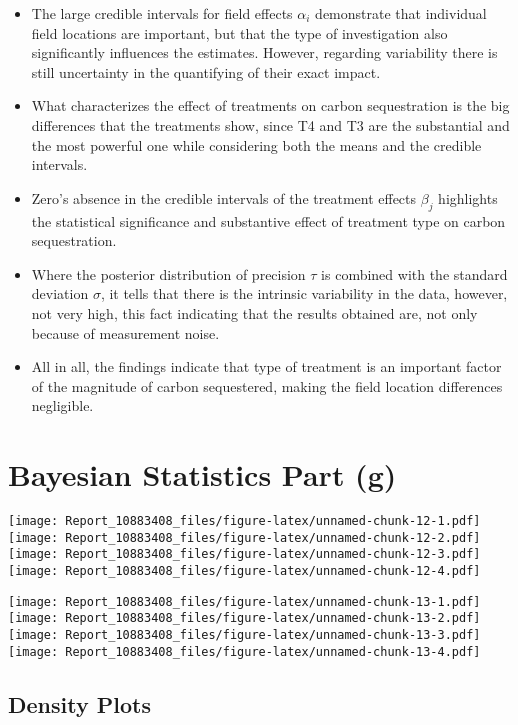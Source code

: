 \documentclass[
]{article}
\providecommand{\tightlist}{%
  \setlength{\itemsep}{0pt}\setlength{\parskip}{0pt}}
\begin{document}
\begin{itemize}
\tightlist
\item
  The large credible intervals for field effects \(\alpha_i\)
  demonstrate that individual field locations are important, but that
  the type of investigation also significantly influences the estimates.
  However, regarding variability there is still uncertainty in the
  quantifying of their exact impact.
\item
  What characterizes the effect of treatments on carbon sequestration is
  the big differences that the treatments show, since T4 and T3 are the
  substantial and the most powerful one while considering both the means
  and the credible intervals.
\item
  Zero's absence in the credible intervals of the treatment effects
  \(\beta_j\) highlights the statistical significance and substantive
  effect of treatment type on carbon sequestration.
\item
  Where the posterior distribution of precision \(\tau\) is combined
  with the standard deviation \(\sigma\), it tells that there is the
  intrinsic variability in the data, however, not very high, this fact
  indicating that the results obtained are, not only because of
  measurement noise.
\item
  All in all, the findings indicate that type of treatment is an
  important factor of the magnitude of carbon sequestered, making the
  field location differences negligible.
\end{itemize}

\section{Bayesian Statistics Part (g)}\label{bayesian-statistics-part-g}

\texttt{[image: Report\_10883408\_files/figure-latex/unnamed-chunk-12-1.pdf]}
\texttt{[image: Report\_10883408\_files/figure-latex/unnamed-chunk-12-2.pdf]}
\texttt{[image: Report\_10883408\_files/figure-latex/unnamed-chunk-12-3.pdf]}
\texttt{[image: Report\_10883408\_files/figure-latex/unnamed-chunk-12-4.pdf]}

\texttt{[image: Report\_10883408\_files/figure-latex/unnamed-chunk-13-1.pdf]}
\texttt{[image: Report\_10883408\_files/figure-latex/unnamed-chunk-13-2.pdf]}
\texttt{[image: Report\_10883408\_files/figure-latex/unnamed-chunk-13-3.pdf]}
\texttt{[image: Report\_10883408\_files/figure-latex/unnamed-chunk-13-4.pdf]}

\subsection{Density Plots}\label{density-plots}
\end{document}
